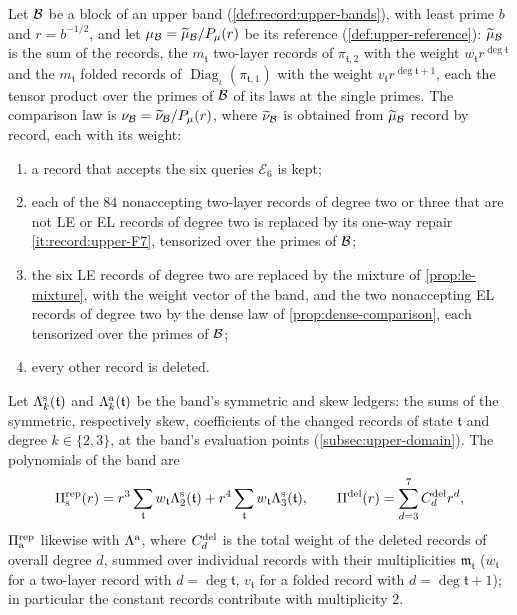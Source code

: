 \begin{definition}\label{def:upper-comparison}
Let $\mathcal B$ be a block of an upper band (\cref{def:record:upper-bands}), with
least prime $b$ and $r=b^{-1/2}$, and let $\mu_\mathcal B=\widetilde\mu_\mathcal B/P_\mu(r)$
be its reference (\cref{def:upper-reference}): $\widetilde\mu_\mathcal B$ is the sum
of the records, the $m_{\mathfrak t}$ two-layer records of $\pi_{\mathfrak t,2}$
with the weight $w_{\mathfrak t}r^{\deg\mathfrak t}$ and the $m_{\mathfrak t}$
folded records of $\operatorname{Diag}_\iota(\pi_{\mathfrak t,1})$ with the
weight $v_{\mathfrak t}r^{\deg\mathfrak t+1}$, each the tensor product over the
primes of $\mathcal B$ of its laws at the single primes. The comparison law is
$\nu_\mathcal B=\widetilde\nu_\mathcal B/P_\mu(r)$, where $\widetilde\nu_\mathcal B$ is obtained
from $\widetilde\mu_\mathcal B$ record by record, each with its weight:
\begin{enumerate}[label=(\alph*)]
\item a record that accepts the six queries $\mathcal E_6$ is kept;
\item each of the $84$ nonaccepting two-layer records of degree two or three that
 are not LE or EL records of degree two is replaced by its one-way repair
 \ref{it:record:upper-F7}, tensorized over the primes of $\mathcal B$;
\item[(b$'$)] the six LE records of degree two are replaced by the mixture of
 \cref{prop:le-mixture}, with the weight vector of the band, and the two
 nonaccepting EL records of degree two by the dense law of
 \cref{prop:dense-comparison}, each tensorized over the primes of $\mathcal B$;
\item every other record is deleted.
\end{enumerate}
Let $\Lambda^{\rm s}_k(\mathfrak t)$ and $\Lambda^{\rm a}_k(\mathfrak t)$ be the band's
symmetric and skew ledgers: the sums of the symmetric, respectively skew,
coefficients of the changed records of state $\mathfrak t$ and degree
$k\in\{2,3\}$, at the band's evaluation points (\cref{subsec:upper-domain}). The
polynomials of the band are
\[
 \Pi^{\rm rep}_{\rm s}(r)=r^3\sum_{\mathfrak t}w_{\mathfrak t}\Lambda^{\rm s}_2(\mathfrak t)
 +r^4\sum_{\mathfrak t}w_{\mathfrak t}\Lambda^{\rm s}_3(\mathfrak t),\qquad
 \Pi^{\rm del}(r)=\sum_{d=3}^7C^{\rm del}_dr^d,
\]
$\Pi^{\rm rep}_{\rm a}$ likewise with $\Lambda^{\rm a}$, where $C^{\rm del}_d$ is the
total weight of the deleted records of overall degree $d$,
summed over individual records with their multiplicities
$\mathfrak m_{\mathfrak t}$ ($w_{\mathfrak t}$ for a two-layer
record with $d=\deg\mathfrak t$, $v_{\mathfrak t}$ for a folded
record with $d=\deg\mathfrak t+1$); in particular the constant
records contribute with multiplicity $2$.
\end{definition}

